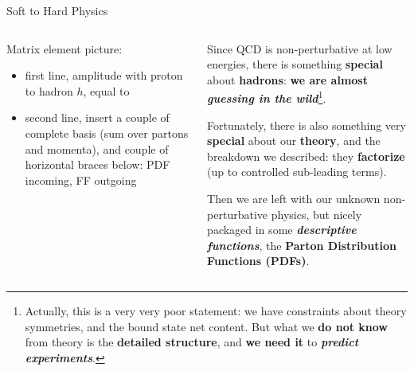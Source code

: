 \documentclass[9pt]{beamer}
\begin{document}
\begin{frame}{Soft to Hard Physics}
    \begin{columns}
        \begin{column}{0.5\textwidth}
            Matrix element picture:
            \begin{itemize}
                \item first line, amplitude with proton to hadron $h$, equal to
                \item second line, insert a couple of complete basis (sum over
                    partons and momenta), and couple of horizontal braces
                    below: PDF incoming, FF outgoing
            \end{itemize}
        \end{column}
        \begin{column}{0.5\textwidth}
            Since QCD is non-perturbative at low energies, there is something
            \textbf{special} about \textbf{hadrons}: \textbf{we are almost
            \textit{guessing in the wild}}\footnote{
                Actually, this is a very very poor statement: we have
                constraints about theory symmetries, and the bound state net
                content. But what we \textbf{do not know} from theory is the
                \textbf{\alert{detailed structure}}, and \textbf{we need it} to
                \textit{\textbf{predict experiments}}.
            }.
            \vspace*{15pt}

            Fortunately, there is also something very \textbf{special} about
            our \textbf{theory}, and the breakdown we described: they
            \alert{\textbf{factorize}} (up to controlled sub-leading terms).
            \vspace*{15pt}

            Then we are left with our unknown non-perturbative physics, but
            nicely packaged in some \textbf{\textit{descriptive functions}},
            the \textbf{\alert{Parton Distribution Functions} (PDFs)}.
            \vspace*{25pt}
        \end{column}
    \end{columns}
\end{frame}
\end{document}
